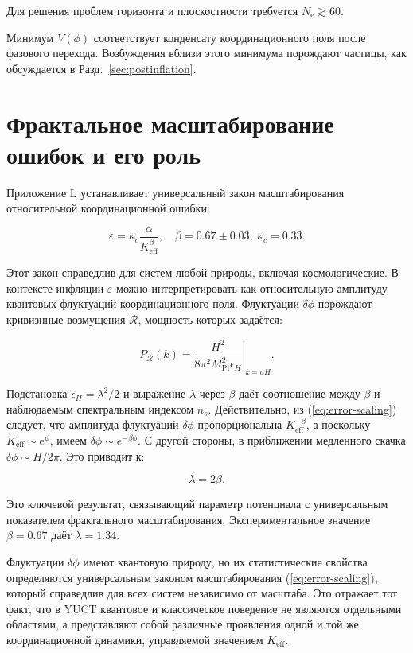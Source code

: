 \documentclass[12pt,a4paper]{article}
\theoremstyle{remark}
\newcommand{\Keff}{K_{\mathrm{eff}}}
\newcommand{\kappac}{\kappa_c}
\newcommand{\eps}{\varepsilon}
\newcommand{\Mpl}{M_{\mathrm{Pl}}}
\newcommand{\ninf}{N_{\mathrm{e}}}
\begin{document}
	Для решения проблем горизонта и плоскостности требуется $\ninf \gtrsim 60$.
	
	Минимум $V(\phi)$ соответствует конденсату координационного поля после фазового перехода. Возбуждения вблизи этого минимума порождают частицы, как обсуждается в Разд.~\ref{sec:postinflation}.
	
	\section{Фрактальное масштабирование ошибок и его роль}
	\label{sec:fractal}
	
	Приложение L устанавливает универсальный закон масштабирования относительной координационной ошибки:
	
	\begin{equation}
		\eps = \kappac \frac{\alpha}{\Keff^{\beta}}, \quad \beta = 0.67 \pm 0.03,\ \kappac = 0.33.
		\label{eq:error-scaling}
	\end{equation}
	
	Этот закон справедлив для систем любой природы, включая космологические. В контексте инфляции $\eps$ можно интерпретировать как относительную амплитуду квантовых флуктуаций координационного поля. Флуктуации $\delta \phi$ порождают кривизнные возмущения $\mathcal{R}$, мощность которых задаётся:
	
	\begin{equation}
		P_{\mathcal{R}}(k) = \left. \frac{H^2}{8\pi^2 \Mpl^2 \epsilon_H} \right|_{k=aH}.
	\end{equation}
	
	Подстановка $\epsilon_H = \lambda^2/2$ и выражение $\lambda$ через $\beta$ даёт соотношение между $\beta$ и наблюдаемым спектральным индексом $n_s$. Действительно, из (\ref{eq:error-scaling}) следует, что амплитуда флуктуаций $\delta \phi$ пропорциональна $\Keff^{-\beta}$, а поскольку $\Keff \sim e^{\phi}$, имеем $\delta \phi \sim e^{-\beta \phi}$. С другой стороны, в приближении медленного скачка $\delta \phi \sim H/2\pi$. Это приводит к:
	
	\begin{equation}
		\lambda = 2\beta.
		\label{eq:lambda-beta}
	\end{equation}
	
	Это ключевой результат, связывающий параметр потенциала с универсальным показателем фрактального масштабирования. Экспериментальное значение $\beta = 0.67$ даёт $\lambda = 1.34$.
	
	Флуктуации $\delta\phi$ имеют квантовую природу, но их статистические свойства определяются универсальным законом масштабирования (\ref{eq:error-scaling}), который справедлив для всех систем независимо от масштаба. Это отражает тот факт, что в YUCT квантовое и классическое поведение не являются отдельными областями, а представляют собой различные проявления одной и той же координационной динамики, управляемой значением $K_{\mathrm{eff}}$.
	
\end{document}
